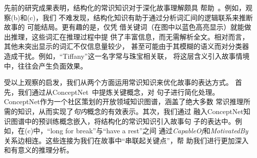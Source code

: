 先前的研究成果表明，结构化的常识知识对于深化故事理解颇具
帮助~\cite{li2019story}。例如，观察(b)和(c)，我们
不难发现，结构化知识有助于通过分析词汇间的逻辑联系来推断故事的
可能结局。更有趣的是，仅凭
借关键词（在图中以蓝色高亮显示）就能做出推理，这些词汇在推理过程中提
供了丰富信息，而无需解析全文。相对而言，其他未突出显示的词汇不仅信息量较少，
甚至可能由于其模糊的语义而对分类器造成干扰。例如，``Tiffany''这一名字常与珠宝相关联，
将这层含义引入故事情境中，往往会产生负面效果。

受以上观察的启发，我们从两个方面运用常识知识来优化故事的表达方式。
首先，我们通过从ConceptNet~\cite{speer2017conceptnet}中提炼关键概念，对
句子进行简化处理。ConceptNet作为一个社区策划的开放领域知识图谱，涵盖了绝大多数
常识推理所需的知识，从而实现了{\em 句内}概念的有效表示。其次，我们通过
融入ConceptNet知识图谱中的预训练概念嵌入，将结构化的常识知识引入故事句
子的表达中。例如，在(c)中，``long for break''与``have a rest''之间
通过{\em CapableOf}和{\em MotivatedBy}关系边相连。这些连接为我们在故事中``串联起关键点''，帮
助我们进行更加深入和有意义的推理分析。






